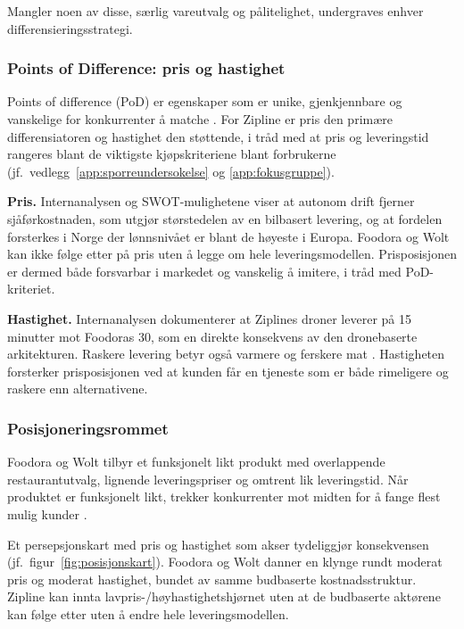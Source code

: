 Mangler noen av disse, særlig vareutvalg og pålitelighet, undergraves
enhver differensieringsstrategi.

\subsubsection{Points of Difference: pris og hastighet}

Points of difference (PoD) er egenskaper som er unike, gjenkjennbare og
vanskelige for konkurrenter å matche \parencite[304]{kotlerkeller2016}. For
Zipline er pris den primære differensiatoren og hastighet den støttende, i
tråd med at pris og leveringstid rangeres blant de viktigste
kjøpskriteriene blant forbrukerne (jf.\ vedlegg~\ref{app:sporreundersokelse}
og \ref{app:fokusgruppe}).

\textbf{Pris.}
Internanalysen og SWOT-mulighetene viser at autonom drift fjerner
sjåførkostnaden, som utgjør størstedelen av en bilbasert levering, og at
fordelen forsterkes i Norge der lønnsnivået er blant de høyeste i Europa.
Foodora og Wolt kan ikke følge etter på pris uten å legge om hele
leveringsmodellen. Prisposisjonen er dermed både forsvarbar i markedet og
vanskelig å imitere, i tråd med PoD-kriteriet.

\textbf{Hastighet.}
Internanalysen dokumenterer at Ziplines droner leverer på 15 minutter mot
Foodoras 30, som en direkte konsekvens av den dronebaserte arkitekturen.
Raskere levering betyr også varmere og ferskere mat \parencite{stevens2025}.
Hastigheten forsterker prisposisjonen ved at kunden får en tjeneste som er
både rimeligere og raskere enn alternativene.

\subsubsection{Posisjoneringsrommet}

Foodora og Wolt tilbyr et funksjonelt likt produkt med overlappende
restaurantutvalg, lignende leveringspriser og omtrent lik leveringstid. Når
produktet er funksjonelt likt, trekker konkurrenter mot midten for å fange
flest mulig kunder \parencite[Forelesning 5]{aspelund2026_forelesninger}.

Et persepsjonskart med pris og hastighet som akser tydeliggjør konsekvensen
(jf.\ figur~\ref{fig:posisjonskart}). Foodora og Wolt danner en klynge rundt
moderat pris og moderat hastighet, bundet av samme budbaserte
kostnadsstruktur. Zipline kan innta lavpris-/høyhastighetshjørnet uten at de 
budbaserte aktørene kan følge etter uten å endre hele leveringsmodellen.

